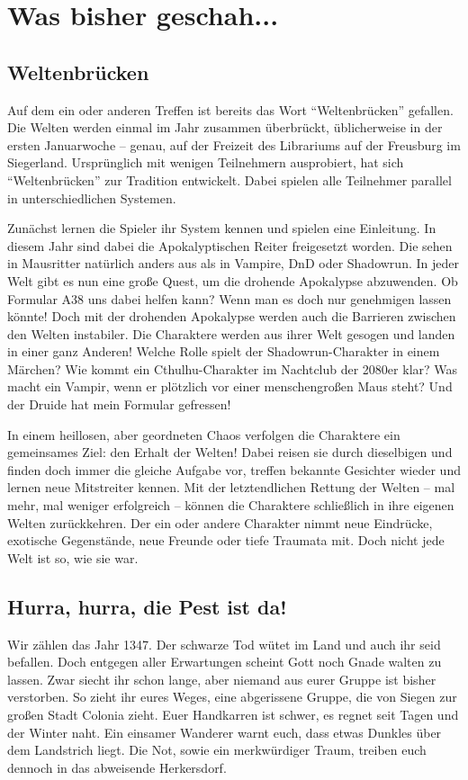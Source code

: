 \documentclass[final]{multiversum}
\begin{document}
\makemultititle
%

\section{Was bisher geschah...}

\subsection{Weltenbrücken}
Auf dem ein oder anderen Treffen ist bereits das Wort \enquote{Weltenbrücken} gefallen.
Die Welten werden einmal im Jahr zusammen überbrückt, üblicherweise in der ersten Januarwoche -- genau, auf der Freizeit des Librariums auf der Freusburg im Siegerland.
Ursprünglich mit wenigen Teilnehmern ausprobiert, hat sich \enquote{Weltenbrücken} zur Tradition entwickelt.
Dabei spielen alle Teilnehmer parallel in unterschiedlichen Systemen.

Zunächst lernen die Spieler ihr System kennen und spielen eine Einleitung.
In diesem Jahr sind dabei die Apokalyptischen Reiter freigesetzt worden.
Die sehen in Mausritter natürlich anders aus als in Vampire, DnD oder Shadowrun.
In jeder Welt gibt es nun eine große Quest, um die drohende Apokalypse abzuwenden.
Ob Formular A38 uns dabei helfen kann? Wenn man es doch nur genehmigen lassen könnte!
Doch mit der drohenden Apokalypse werden auch die Barrieren zwischen den Welten instabiler.
Die Charaktere werden aus ihrer Welt gesogen und landen in einer ganz Anderen!
Welche Rolle spielt der Shadowrun-Charakter in einem Märchen?
Wie kommt ein Cthulhu-Charakter im Nachtclub der 2080er klar?
Was macht ein Vampir, wenn er plötzlich vor einer menschengroßen Maus steht?
Und der Druide hat mein Formular gefressen!

In einem heillosen, aber geordneten Chaos verfolgen die Charaktere ein gemeinsames Ziel: den Erhalt der Welten!
Dabei reisen sie durch dieselbigen und finden doch immer die gleiche Aufgabe vor, treffen bekannte Gesichter wieder und lernen neue Mitstreiter kennen.
Mit der letztendlichen Rettung der Welten -- mal mehr, mal weniger erfolgreich -- können die Charaktere schließlich in ihre eigenen Welten zurückkehren.
Der ein oder andere Charakter nimmt neue Eindrücke, exotische Gegenstände, neue Freunde oder tiefe Traumata mit.
Doch nicht jede Welt ist so, wie sie war.

\subsection{Hurra, hurra, die Pest ist da!}
Wir zählen das Jahr 1347. 
Der schwarze Tod wütet im Land und auch ihr seid befallen.
Doch entgegen aller Erwartungen scheint Gott noch Gnade walten zu lassen.
Zwar siecht ihr schon lange, aber niemand aus eurer Gruppe ist bisher verstorben.
So zieht ihr eures Weges, eine abgerissene Gruppe, die von Siegen zur großen Stadt Colonia zieht.
Euer Handkarren ist schwer, es regnet seit Tagen und der Winter naht.
Ein einsamer Wanderer warnt euch, dass etwas Dunkles über dem Landstrich liegt.
Die Not, sowie ein merkwürdiger Traum, treiben euch dennoch in das abweisende Herkersdorf.
\end{document}
